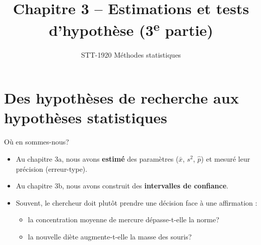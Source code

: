 \documentclass{BeamerTemplate}
\title{Chapitre 3 -- Estimations et tests d'hypothèse (3\textsuperscript{e} partie)}
\subtitle{STT-1920 Méthodes statistiques}
\date{}
\begin{document}
\begin{frame}[t]
  \titlepage
\end{frame}

\section{Des hypothèses de recherche aux hypothèses statistiques}

\begin{frame}[t]{Où en sommes-nous?}
  \begin{itemize}\itemsep 2mm
    \item Au \alert{chapitre 3a}, nous avons \textbf{estimé} des paramètres ($\bar{x}$, $s^2$, $\hat{p}$) et mesuré leur précision (erreur-type).
    \item Au \alert{chapitre 3b}, nous avons construit des \textbf{intervalles de confiance}.
    \item<2-> Souvent, le chercheur doit plutôt \alert{prendre une décision} face à une affirmation :
      \begin{itemize}
        \item la concentration moyenne de mercure dépasse-t-elle la norme?
        \item la nouvelle diète augmente-t-elle la masse des souris?
      \end{itemize}
  \end{itemize}

  \vspace{-2mm}
\end{frame}
\end{document}
